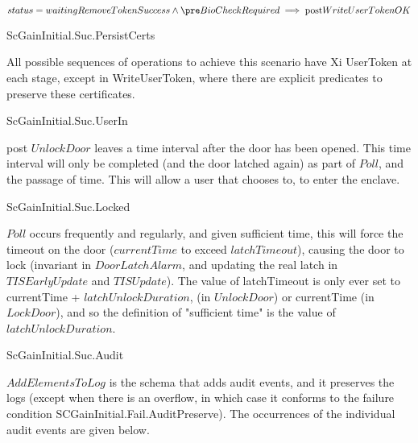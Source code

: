 \[ 
status = waitingRemoveTokenSuccess \land \pre BioCheckRequired
\implies {\rm post} WriteUserTokenOK 
\]

{\footnotesize \sf
ScGainInitial.Suc.PersistCerts
}

All possible sequences of operations to achieve this scenario have Xi UserToken at each stage, except in WriteUserToken, where there are explicit predicates to preserve these certificates.

{\footnotesize \sf
ScGainInitial.Suc.UserIn
}

post $UnlockDoor$ leaves a time interval after the door has been
opened. This time interval will only be completed (and the door
latched again) as part of $Poll$, and the passage of time. This will
allow a user that chooses to, to enter the enclave. 

{\footnotesize \sf
ScGainInitial.Suc.Locked
}

$Poll$ occurs frequently and regularly, and given sufficient time,
this will force the timeout on the door ($currentTime$ to exceed
$latchTimeout$), causing the door to lock (invariant in $DoorLatchAlarm$,
and updating the real latch in $TISEarlyUpdate$ and $TISUpdate$). The
value of latchTimeout is only ever set to currentTime +
$latchUnlockDuration$, (in $UnlockDoor$) or currentTime (in $LockDoor$), and
so the definition of "sufficient time" is the value of
$latchUnlockDuration$.

{\footnotesize \sf
ScGainInitial.Suc.Audit
}

$AddElementsToLog$ is the schema that adds audit events, and it
preserves the logs (except when there is an overflow, in which case it
conforms to the failure condition
SCGainInitial.Fail.AuditPreserve). The occurrences of the individual
audit events are given below.

